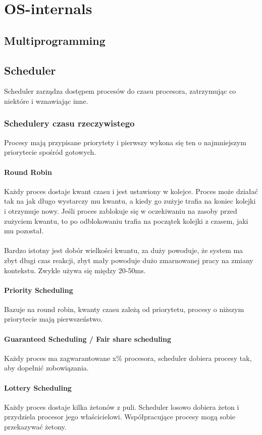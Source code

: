 \documentclass[12pt, a4paper, polish, openany]{book}
\begin{document}
\chapter{OS-internals}
\section{Multiprogramming}
\section{Scheduler}
Scheduler zarządza dostępem procesów do czasu procesora, zatrzymując co niektóre i wznawiając inne.
\subsection{Schedulery czasu rzeczywistego}
Procesy mają przypisane priorytety i pierwszy wykona się ten o najmniejszym priorytecie spośród gotowych.
\subsubsection{Round Robin}
Każdy proces dostaje kwant czasu i jest ustawiony w kolejce. Proces może działać tak na jak długo wystarczy mu kwantu, a kiedy go zużyje trafia na koniec kolejki i otrzymuje nowy. Jeśli proces zablokuje się w oczekiwaniu na zasoby przed zużyciem kwantu, to po odblokowaniu trafia na początek kolejki z czasem, jaki mu pozostał.\\\\
Bardzo istotny jest dobór wielkości kwantu, za duży powoduje, że system ma zbyt długi czas reakcji, zbyt mały powoduje dużo zmarnowanej pracy na zmiany kontekstu. Zwykle używa się między 20-50ms.
\subsubsection{Priority Scheduling}
Bazuje na round robin, kwanty czasu zależą od priorytetu, procesy o niższym priorytecie mają pierwszeństwo. 
\subsubsection{Guaranteed Scheduling / Fair share scheduling}
Każdy proces ma zagwarantowane x\% procesora, scheduler dobiera procesy tak, aby dopełnić zobowiązania.
\subsubsection{Lottery Scheduling}
Każdy proces dostaje kilka żetonów z puli. Scheduler losowo dobiera żeton i przydziela procesor jego właścicielowi. Współpracujące procesy mogą sobie przekazywać żetony.
\end{document}
